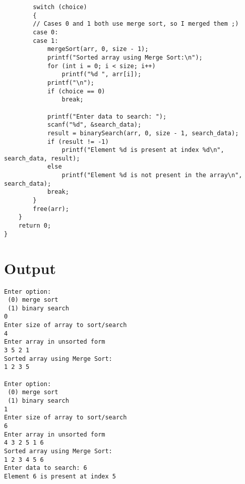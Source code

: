 \documentclass[12pt]{article}
\begin{document}
\begin{verbatim}
        switch (choice)
        {
        // Cases 0 and 1 both use merge sort, so I merged them ;)
        case 0:
        case 1:
            mergeSort(arr, 0, size - 1);
            printf("Sorted array using Merge Sort:\n");
            for (int i = 0; i < size; i++)
                printf("%d ", arr[i]);
            printf("\n");
            if (choice == 0)
                break;

            printf("Enter data to search: ");
            scanf("%d", &search_data);
            result = binarySearch(arr, 0, size - 1, search_data);
            if (result != -1)
                printf("Element %d is present at index %d\n", search_data, result);
            else
                printf("Element %d is not present in the array\n", search_data);
            break;
        }
        free(arr);
    }
    return 0;
}
	\end{verbatim}
	\section*{Output}
	\begin{verbatim}
Enter option:
 (0) merge sort
 (1) binary search
0
Enter size of array to sort/search
4
Enter array in unsorted form
3 5 2 1
Sorted array using Merge Sort:
1 2 3 5 

Enter option:
 (0) merge sort
 (1) binary search
1
Enter size of array to sort/search
6
Enter array in unsorted form
4 3 2 5 1 6
Sorted array using Merge Sort:
1 2 3 4 5 6 
Enter data to search: 6
Element 6 is present at index 5
	\end{verbatim}
\end{document}
